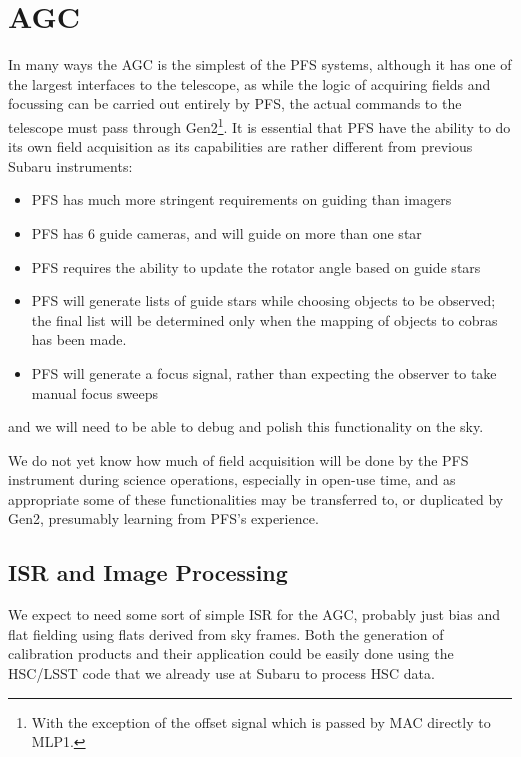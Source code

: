 \documentclass[12pt]{article}
\newcommand{\AGC}{\gls{AGC}\xspace}
\newcommand{\PFS}{\gls{PFS}\xspace}
\begin{document}
\section{AGC}
\label{sec:AGC}

In many ways the \AGC is the simplest of the \PFS systems, although it has one of the largest interfaces to
the telescope, as while the logic of acquiring fields and focussing can be carried out entirely by \PFS,
the actual
commands to the telescope must pass through \gls{Gen2}\footnote{With the exception of the offset signal
  which is passed by \gls{MAC} directly to \gls{MLP1}.}.  It is essential that \PFS have the ability to do its
own field acquisition as its capabilities are rather different from previous Subaru instruments:
\begin{itemize}
\item \PFS has much more stringent requirements on guiding than imagers
\item \PFS has 6 guide cameras, and will guide on more than one star
\item \PFS requires the ability to update the rotator angle based on guide stars
\item \PFS will generate lists of guide stars while choosing objects to be observed;  the final
  list will be determined only when the mapping of objects to cobras has been made.
\item \PFS will generate a focus signal, rather than expecting the observer to take
  manual focus sweeps
\end{itemize}
and we will need to be able to debug and polish this functionality on the sky.

We do not yet know how much of field acquisition will be done by the \PFS instrument during
science operations, especially in open-use time, and as appropriate some of these functionalities may be
transferred to, or duplicated by \gls{Gen2}, presumably learning from \PFS's experience.

\subsection{ISR and Image Processing}

We expect to need some sort of simple \gls{ISR} for the \AGC, probably just bias and flat fielding using
flats derived from sky frames.  Both the generation of calibration products and their application could
be easily done using the \gls{HSC}/\gls{LSST} code that we already use at Subaru to process \gls{HSC} data.
\end{document}
